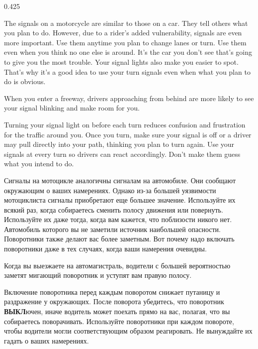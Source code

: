 \begin{langblock}{0.425}
	\begin{eng}
	
	The signals on a motorcycle are similar to those on a car. They tell others what you plan to do. However, due to a rider's added vulnerability, signals are even more important. Use them anytime you plan to change lanes or turn. Use them even when you think no one else is around. It's the car you don't see that's going to give you the most trouble. Your signal lights also make you easier to spot.  That's why it's a good idea to use your turn signals even when what you plan to do is obvious.
	
	When you enter a freeway, drivers approaching from behind are more likely to see your signal blinking and make room for you.
	
	Turning your signal light on before each turn reduces confusion and frustration for the traffic around you. Once you turn, make sure your signal is off or a driver may pull directly into your path, thinking you plan to turn again. Use your signals at every turn so drivers can react accordingly. Don't make them guess what you intend to do.
	\end{eng}
	\begin{rus}
		
		Сигналы на мотоцикле аналогичны сигналам на автомобиле. Они сообщают окружающим о ваших намерениях. Однако из-за большей уязвимости мотоциклиста сигналы приобретают еще большее значение. Используйте их всякий раз, когда собираетесь сменить полосу движения или повернуть. Используйте их даже тогда, когда вам кажется, что поблизости никого нет. Автомобиль которого вы не заметили источник наибольшей опасности. Поворотники также делают вас более заметным.  Вот почему надо включать поворотники даже в тех случаях, когда ваши намерения очевидны.
		
		Когда вы выезжаете на автомагистраль, водители с большей вероятностью заметят мигающий поворотник и уступят вам правую полосу.
		
		Включение поворотника перед каждым поворотом снижает путаницу и раздражение у окружающих. После поворота убедитесь, что поворотник \textbf{ВЫКЛ}ючен, иначе водитель может поехать прямо на вас, полагая, что вы собираетесь поворачивать. Используйте поворотники при каждом повороте, чтобы водители могли соответствующим образом реагировать. Не вынуждайте их гадать о ваших намерениях.
\end{rus}
\end{langblock}


